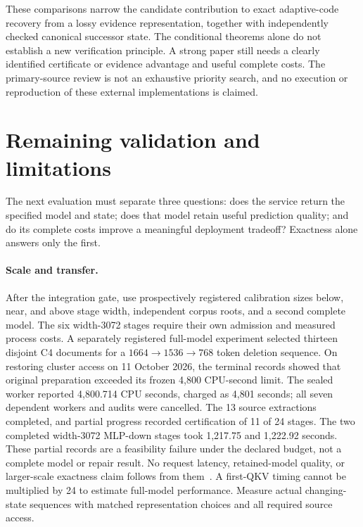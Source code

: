 \documentclass[10pt,twocolumn,letterpaper]{article}
\begin{document}
These comparisons narrow the candidate contribution to exact adaptive-code
recovery from a lossy evidence representation, together with independently
checked canonical successor state. The conditional theorems alone do not
establish a new verification principle. A strong paper still needs a clearly
identified certificate or evidence advantage and useful complete costs. The
primary-source review is not an exhaustive priority search, and no execution or
reproduction of these external implementations is claimed.

\section{Remaining validation and limitations}
The next evaluation must separate three questions: does the service return the
specified model and state; does that model retain useful prediction quality; and
do its complete costs improve a meaningful deployment tradeoff? Exactness alone
answers only the first.

\paragraph{Scale and transfer.}
After the integration gate, use prospectively registered calibration sizes below,
near, and above stage width, independent corpus roots, and a second complete model.
The six width-3072 stages require their own admission and measured process costs.
A separately registered full-model experiment selected thirteen disjoint C4
documents for a $1664\to1536\to768$ token deletion sequence. On restoring
cluster access on 11 October 2026, the terminal records showed that original
preparation exceeded its frozen 4,800 CPU-second limit. The sealed worker
reported 4,800.714 CPU seconds, charged as 4,801 seconds; all seven dependent
workers and audits were cancelled. The 13 source extractions completed, and
partial progress recorded certification of 11 of 24 stages. The two completed
width-3072 MLP-down stages took 1,217.75 and 1,222.92 seconds. These partial
records are a feasibility failure under the declared budget, not a complete
model or repair result. No request latency, retained-model quality, or
larger-scale exactness claim follows from them~\cite{v49failure}.
A first-QKV timing cannot be multiplied by 24 to estimate full-model performance.
Measure actual changing-state sequences with matched representation choices and
all required source access.
\end{document}
